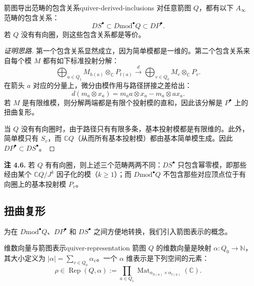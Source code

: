 \begin{theorem}{箭图导出范畴的包含关系}{quiver-derived-inclusions}
对任意箭图 $Q$，都有以下 $A_\infty$ 范畴的包含关系：
\[
  DS^\bullet\subset D\mathrm{mod}^\bullet Q\subset DP^\bullet.
\]
若 $Q$ 没有有向圈，则这些包含关系都是等价。
\end{theorem}
\begin{proof}[证明思路]
第一个包含关系显然成立，因为简单模都是一维的。第二个包含关系来自每个模 $M$ 都有如下标准投射分解：
\[
  \bigoplus_{a\in Q_1}M_{h(a)}\otimes_{\mathbb C}P_{t(a)}
  \xrightarrow{\ d\ }
  \bigoplus_{v\in Q_0}M_v\otimes_{\mathbb C}P_v.
\]
在箭头 $a$ 对应的分量上，微分由模作用与路径拼接之差给出：
\[
  d(m_a\otimes x_a)=m_a a\otimes x_a-m_a\otimes ax_a.
\]
若 $M$ 是有限维模，则分解两端都是有限个投射模的直和，因此该分解是 $P^\bullet$ 上的扭曲复形。

当 $Q$ 没有有向圈时，由于路径只有有限多条，基本投射模都是有限维的。此外，简单模只有 $S_v$，而 $\mathbb C Q$（从而所有基本投射模）都由基本简单模生成。因此 $DP^\bullet\subset DS^\bullet$。
\end{proof}

\begin{note}\label{note:quiver-oriented-cycles}
\textbf{注 4.6.} 若 $Q$ 有有向圈，则上述三个范畴两两不同：$DS^\bullet$ 只包含幂零模，即那些经由某个 $\mathbb C Q/J^k$ 因子化的模（$k\geq1$）；而 $D\mathrm{mod}^\bullet Q$ 不包含那些对应顶点位于有向圈上的基本投射模 $P_v$。
\end{note}

\subsection{扭曲复形}\label{subsec:quiver-twisted-complexes}
为在 $D\mathrm{mod}^\bullet Q$、$DP^\bullet$ 和 $DS^\bullet$ 之间方便地转换，我们引入箭图表示的概念。

\begin{definition}{维数向量与箭图表示}{quiver-representation}
箭图 $Q$ 的维数向量是映射 $\alpha\colon Q_0\to\mathbb N$，其大小定义为 $|\alpha|=\sum_{v\in Q_0}\alpha_v$。一个 $\alpha$ 维表示是下列空间的元素：
\[
  \rho\in\operatorname{Rep}(Q,\alpha)
  :=\prod_{a\in Q_1}\operatorname{Mat}_{\alpha_{h(a)}\times\alpha_{t(a)}}(\mathbb C).
\]
\end{definition}

